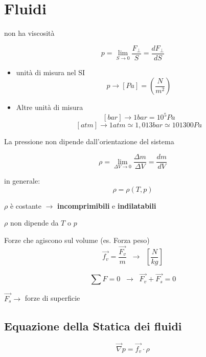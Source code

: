 \section{Fluidi}
 non ha viscosità
\vspace{\baselineskip}

    \begin{equation*}
        p = \lim_{S \to 0} \frac{F_\perp}{S} = \frac{dF_\perp}{dS}
    \end{equation*}
\begin{itemize}
    \item unità di misura nel SI
    \begin{equation*}
        p \to [Pa] = \left ( \frac{N}{m^2} \right )
    \end{equation*}
    
    \item Altre unità di misura
    \[
        [bar] \to 1 bar = 10^5 Pa 
    \]
    \[
        [atm] \to 1 atm \simeq 1,013 bar \simeq 101300 Pa
    \]
\end{itemize}

 La pressione non dipende dall'orientazione del sistema
\vspace{\baselineskip}

    \begin{equation*}
        \rho = \lim_{\Delta V \to 0} \frac{\Delta m}{\Delta V} = \frac{dm}{dV}
    \end{equation*}

\setlength\parindent{25pt} in generale:
    \begin{equation*}
        \rho = \rho(T, p)
    \end{equation*}
    
 $\rho$ è costante $\to$ \textbf{incomprimibili} e \textbf{indilatabili}

\setlength\parindent{90pt} $\rho$ non dipende da $T$ o $p$

 Forze che agiscono sul volume (es. Forza peso)
\[
\vec{f_v} = \frac{\vec{F_v}}{m} \;\; \to \;\; \left [ \frac{N}{kg} \right]
\]

\[
\sum F = 0 \;\; \to \;\; \vec{F_v} + \vec{F_s} = 0
\]

\begin{center}$\vec{F_s} \to$ forze di superficie \end{center}

\subsection{Equazione della Statica dei fluidi}
\begin{equation}
    \boxed{\vec{\nabla} p = \vec{f_v} \cdot \rho}
\end{equation}

